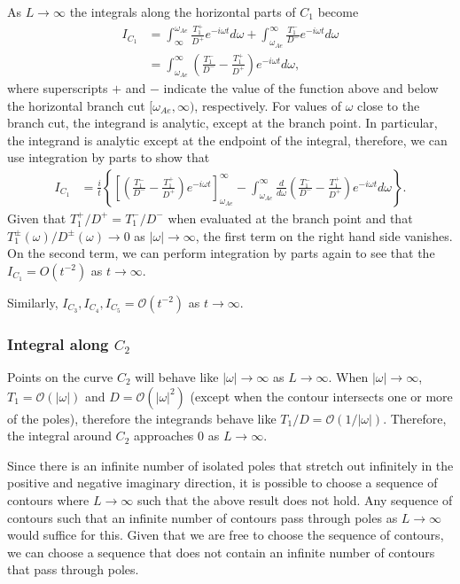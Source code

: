 As $L \to \infty$ the integrals along the horizontal parts of $C_1$ become
\begin{align}
I_{C_1}
&= \int_{\infty}^{\omega_{Ae}} \frac{T_1^+}{D^+} e^{-i\omega t} d\omega + \int_{\omega_{Ae}}^{\infty} \frac{T_1^-}{D^-} e^{-i\omega t} d\omega \\
&= \int_{\omega_{Ae}}^{\infty} \left( \frac{T_1^-}{D^-} - \frac{T_1^+}{D^+} \right) e^{-i\omega t} d\omega,
\end{align}
where superscripts $+$ and $-$ indicate the value of the function above and below the horizontal branch cut $[\omega_{Ae}, \infty)$, respectively. For values of $\omega$ close to the branch cut, the integrand is analytic, except at the branch point. In particular, the integrand is analytic except at the endpoint of the integral, therefore, we can use integration by parts to show that
\begin{align}
I_{C_1} &= \frac{i}{t} \left\{ \left[ \left( \frac{T_1^-}{D^-} - \frac{T_1^+}{D^+} \right) e^{-i\omega t}\right]_{\omega_{Ae}}^{\infty} - \int_{\omega_{Ae}}^{\infty} \frac{d}{d\omega} \left( \frac{T_1^-}{D^-} - \frac{T_1^+}{D^+} \right) e^{-i\omega t} d\omega \right\}.
\end{align}
Given that $T_1^+/D^+ = T_1^-/D^-$ when evaluated at the branch point and that $T_1^\pm(\omega)/D^\pm(\omega) \to 0$ as $|\omega| \to \infty$, the first term on the right hand side vanishes. On the second term, we can perform integration by parts again to see that the $I_{C_1} = O(t^{-2})$ as $t \to \infty$. 

Similarly, $I_{C_3}, I_{C_4}, I_{C_5} = \mathcal{O}(t^{-2})$ as $t \to \infty$.


\subsubsection{Integral along \texorpdfstring{$C_2$}{C2}}
Points on the curve $C_2$ will behave like $|\omega| \to \infty$ as $L \to \infty$. When $|\omega| \to \infty$, $T_1 = \mathcal{O}(|\omega|)$ and $D = \mathcal{O}(|\omega|^2)$ (except when the contour intersects one or more of the poles), therefore the integrands behave like $T_1/D = \mathcal{O}(1/|\omega|)$. Therefore, the integral around $C_2$ approaches $0$ as $L \to \infty$.

Since there is an infinite number of isolated poles that stretch out infinitely in the positive and negative imaginary direction, it is possible to choose a sequence of contours where $L \to \infty$ such that the above result does not hold. Any sequence of contours such that an infinite number of contours pass through poles as $L \to \infty$ would suffice for this. Given that we are free to choose the sequence of contours, we can choose a sequence that does not contain an infinite number of contours that pass through poles.


